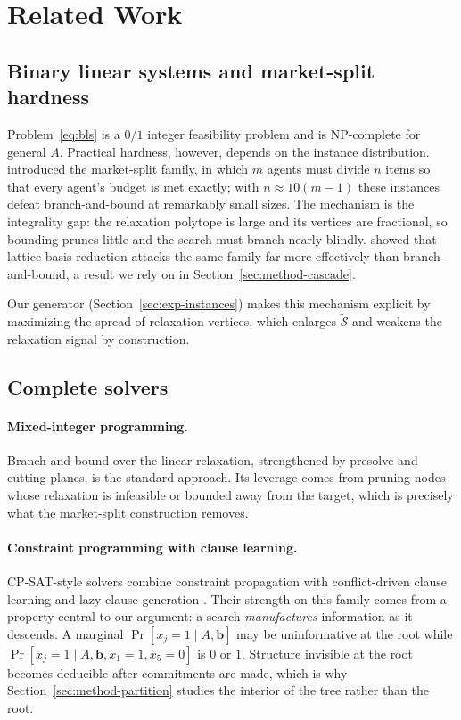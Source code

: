 \documentclass[11pt]{article}
\newcommand{\SOL}{\mathcal{S}}
\begin{document}
\section{Related Work}
\label{sec:related}

\subsection{Binary linear systems and market-split hardness}

Problem~\eqref{eq:bls} is a $0/1$ integer feasibility problem and is NP-complete for general $A$. Practical hardness, however, depends on the instance distribution. \citet{cornuejols1999market} introduced the market-split family, in which $m$ agents must divide $n$ items so that every agent's budget is met exactly; with $n\approx 10(m-1)$ these instances defeat branch-and-bound at remarkably small sizes. The mechanism is the integrality gap: the relaxation polytope is large and its vertices are fractional, so bounding prunes little and the search must branch nearly blindly. \citet{aardal2000market} showed that lattice basis reduction attacks the same family far more effectively than branch-and-bound, a result we rely on in Section~\ref{sec:method-cascade}.

Our generator (Section~\ref{sec:exp-instances}) makes this mechanism explicit by maximizing the spread of relaxation vertices, which enlarges $\tilde{\SOL}$ and weakens the relaxation signal by construction.

\subsection{Complete solvers}

\paragraph{Mixed-integer programming.} Branch-and-bound over the linear relaxation, strengthened by presolve and cutting planes, is the standard approach. Its leverage comes from pruning nodes whose relaxation is infeasible or bounded away from the target, which is precisely what the market-split construction removes.

\paragraph{Constraint programming with clause learning.} CP-SAT-style solvers combine constraint propagation with conflict-driven clause learning \citep{marquessilva1999grasp, moskewicz2001chaff} and lazy clause generation \citep{ohrimenko2009propagation}. Their strength on this family comes from a property central to our argument: a search \emph{manufactures} information as it descends. A marginal $\Pr[x_j=1\mid A,\mathbf{b}]$ may be uninformative at the root while $\Pr[x_j=1\mid A,\mathbf{b},x_1{=}1,x_5{=}0]$ is $0$ or $1$. Structure invisible at the root becomes deducible after commitments are made, which is why Section~\ref{sec:method-partition} studies the interior of the tree rather than the root.
\end{document}
